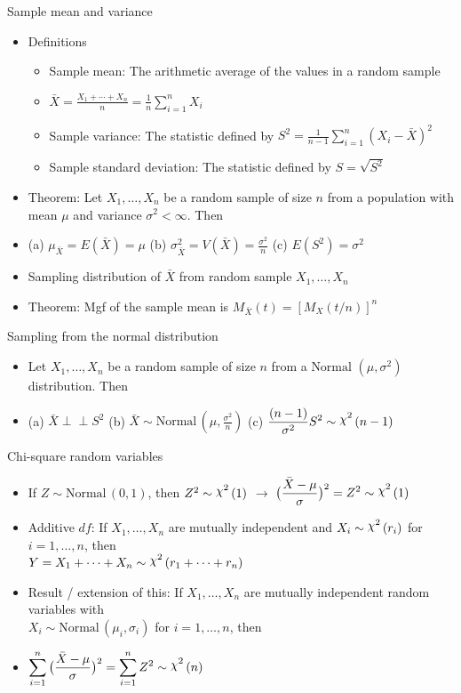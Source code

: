 \documentclass{article}
\newcommand{\ind}{\perp \!\!\! \perp}			%
\newcommand{\follow}[1]{\sim \text{#1}\,}		%
\newcommand{\vecn}[2]{#1_1, \ldots, #1_{#2}}	%
\newcommand{\chisq}{\raisebox{2pt}{$\chi^2$}}		%
\begin{document}
Sample mean and variance
\begin{itemize}
    \item Definitions
    \begin{itemize}
        \item Sample mean: The arithmetic average of the values in a random sample
        \item[] $\displaystyle \bar{X} = \frac{X_1 + \cdots + X_n}{n} = \frac{1}{n} \sum_{i = 1}^n X_i$
        \item Sample variance: The statistic defined by $\displaystyle S^2 = \frac{1}{n - 1} \sum_{i = 1}^n (X_i - \bar{X})^2$
        \item Sample standard deviation: The statistic defined by $S = \sqrt{S^2}$
    \end{itemize}
    \item Theorem: Let $\vecn{X}{n}$ be a random sample of size $n$ from a population with mean $\mu$ and variance $\sigma^2 < \infty$. Then
    \item[] (a) $\mu_{\bar{X}} = E(\bar{X}) = \mu$ \hspace{20pt} (b) $\sigma_{\bar{X}}^2 = V(\bar{X}) = \frac{\sigma^2}{n}$ \hspace{20pt} (c) $E(S^2) = \sigma^2$
    \item Sampling distribution of $\bar{X}$ from random sample $\vecn{X}{n}$
    \item[] Theorem: Mgf of the sample mean is $M_{\bar{X}}(t) = [M_X(t / n)]^n$
\end{itemize}\bigskip
     
Sampling from the normal distribution
\begin{itemize}
    \item Let $\vecn{X}{n}$ be a random sample of size $n$ from a $\text{Normal }(\mu, \sigma^2)$ distribution. Then
    \item[] (a) $\bar{X} \ind S^2$ \hspace{20pt} (b) $\bar{X} \follow{Normal}(\mu, \frac{\sigma^2}{n})$ \hspace{20pt} (c) $\displaystyle \frac{(n-1)}{\sigma^2} S^2  \follow{\chisq}(n-1)$
\end{itemize}\bigskip

Chi-square random variables
\begin{itemize}
    \item If $Z \follow{Normal}(0, 1)$, then $Z^2 \follow{\chisq}(1)$ $\rightarrow$ $\displaystyle \big(\frac{\bar{X} - \mu}{\sigma}\big)^2 = Z^2 \follow{\chisq}(1)$
    \item Additive $df$: If $\vecn{X}{n}$ are mutually independent and $X_i \follow{\chisq}(r_i)$ for $i = 1, \ldots, n$, then \\ $Y = X_1 + \cdots + X_n \follow{\chisq}(r_1 + \cdots + r_n)$
    \item Result / extension of this: If $\vecn{X}{n}$ are mutually independent random variables with \\ $X_i \follow{Normal}(\mu_i, \sigma_i)$ for $i = 1, \ldots, n$, then
    \item[] $\displaystyle \sum_{i=1}^n \big(\frac{\bar{X} - \mu}{\sigma}\big)^2 = \sum_{i=1}^n Z^2 \follow{\chisq}(n)$
\end{itemize}\bigskip
\end{document}
